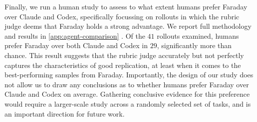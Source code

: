 \documentclass[garamond,a4paper]{inherent}
\renewcommand{\sectionautorefname}{Section}%
\renewcommand{\subsectionautorefname}{Section}%
\renewcommand{\subsubsectionautorefname}{Section}%
\DeclareRobustCommand{\appref}[1]{%
  \begingroup
  \renewcommand{\sectionautorefname}{Appendix}%
  \renewcommand{\subsectionautorefname}{Appendix}%
  \renewcommand{\subsubsectionautorefname}{Appendix}%
  \autoref{#1}%
  \endgroup}
\newcommand{\faradayname}{Faraday\xspace}
\begin{document}
Finally, we run a human study to assess to what extent humans prefer \faradayname over Claude and Codex, specifically focussing on rollouts in which the rubric judge deems that \faradayname holds a strong advantage. We report full methodology and results in \appref{app:agent-comparison}. Of the $41$ rollouts examined, humans prefer \faradayname over both Claude and Codex in $29$, significantly more than chance. This result suggests that the rubric judge accurately but not perfectly captures the characteristics of good replication, at least when it comes to the best-performing samples from \faradayname. Importantly, the design of our study does not allow us to draw any conclusions as to whether humans prefer \faradayname over Claude and Codex on average. Gathering conclusive evidence for this preference would require a larger-scale study across a randomly selected set of tasks, and is an important direction for future work. 
\end{document}
